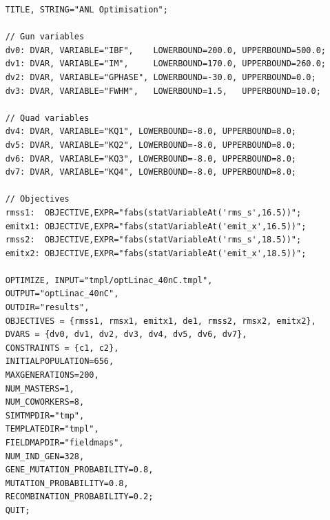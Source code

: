 \vspace{0.2cm}
{\footnotesize \begin{verbatim}
	TITLE, STRING="ANL Optimisation";
	
	// Gun variables
	dv0: DVAR, VARIABLE="IBF",    LOWERBOUND=200.0, UPPERBOUND=500.0;
	dv1: DVAR, VARIABLE="IM",     LOWERBOUND=170.0, UPPERBOUND=260.0;
	dv2: DVAR, VARIABLE="GPHASE", LOWERBOUND=-30.0, UPPERBOUND=0.0;
	dv3: DVAR, VARIABLE="FWHM",   LOWERBOUND=1.5,   UPPERBOUND=10.0;
	
	// Quad variables
	dv4: DVAR, VARIABLE="KQ1", LOWERBOUND=-8.0, UPPERBOUND=8.0;
	dv5: DVAR, VARIABLE="KQ2", LOWERBOUND=-8.0, UPPERBOUND=8.0;
	dv6: DVAR, VARIABLE="KQ3", LOWERBOUND=-8.0, UPPERBOUND=8.0;
	dv7: DVAR, VARIABLE="KQ4", LOWERBOUND=-8.0, UPPERBOUND=8.0;
	
	// Objectives
	rmss1:  OBJECTIVE,EXPR="fabs(statVariableAt('rms_s',16.5))";
	emitx1: OBJECTIVE,EXPR="fabs(statVariableAt('emit_x',16.5))";	
	rmss2:  OBJECTIVE,EXPR="fabs(statVariableAt('rms_s',18.5))";
	emitx2: OBJECTIVE,EXPR="fabs(statVariableAt('emit_x',18.5))";
	
	OPTIMIZE, INPUT="tmpl/optLinac_40nC.tmpl",
	OUTPUT="optLinac_40nC",
	OUTDIR="results",
	OBJECTIVES = {rmss1, rmsx1, emitx1, de1, rmss2, rmsx2, emitx2},
	DVARS = {dv0, dv1, dv2, dv3, dv4, dv5, dv6, dv7},
	CONSTRAINTS = {c1, c2},
	INITIALPOPULATION=656,
	MAXGENERATIONS=200,
	NUM_MASTERS=1,
	NUM_COWORKERS=8,
	SIMTMPDIR="tmp",
	TEMPLATEDIR="tmpl",
	FIELDMAPDIR="fieldmaps",
	NUM_IND_GEN=328,
	GENE_MUTATION_PROBABILITY=0.8,
	MUTATION_PROBABILITY=0.8,
	RECOMBINATION_PROBABILITY=0.2;
	QUIT;
	\end{verbatim}}
\vspace{0.2cm}

